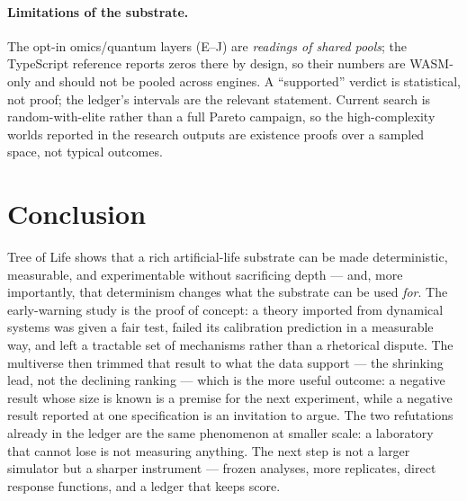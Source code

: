 \documentclass[11pt,a4paper]{article}
\begin{document}
\paragraph{Limitations of the substrate.} The opt-in omics/quantum layers
(E--J) are \emph{readings of shared pools}; the TypeScript reference reports
zeros there by design, so their numbers are WASM-only and should not be pooled
across engines. A ``supported'' verdict is statistical, not proof; the ledger's
intervals are the relevant statement. Current search is random-with-elite rather
than a full Pareto campaign, so the high-complexity worlds reported in the
research outputs are existence proofs over a sampled space, not typical outcomes.

\section{Conclusion}\label{sec:concl}
Tree of Life shows that a rich artificial-life substrate can be made
deterministic, measurable, and experimentable without sacrificing depth --- and,
more importantly, that determinism changes what the substrate can be used
\emph{for}. The early-warning study is the proof of concept: a theory imported
from dynamical systems was given a fair test, failed its calibration prediction
in a measurable way, and left a tractable set of mechanisms rather than a
rhetorical dispute. The multiverse then trimmed that result to what the data
support --- the shrinking lead, not the declining ranking --- which is the more
useful outcome: a negative result whose size is known is a premise for the next
experiment, while a negative result reported at one specification is an
invitation to argue. The two refutations already in the ledger are the same
phenomenon at smaller scale: a laboratory that cannot lose is not measuring
anything. The next step is not a larger simulator but a sharper instrument ---
frozen analyses, more replicates, direct response functions, and a ledger that
keeps score.



\end{document}
